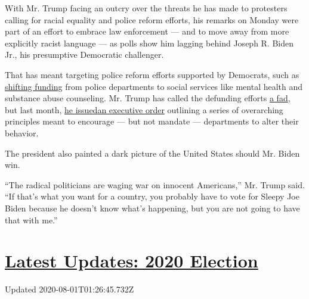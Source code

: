 With Mr. Trump facing an outcry over the threats he has made to
protesters calling for racial equality and police reform efforts, his
remarks on Monday were part of an effort to embrace law enforcement ---
and to move away from more explicitly racist language --- as polls show
him lagging behind Joseph R. Biden Jr., his presumptive Democratic
challenger.

That has meant targeting police reform efforts supported by Democrats,
such as
\href{https://www.cnn.com/2020/06/25/politics/house-police-reform-legislation-vote/index.html}{shifting
funding} from police departments to social services like mental health
and substance abuse counseling. Mr. Trump has called the defunding
efforts
\href{https://www.politico.com/news/2020/07/10/trump-defund-the-police-fad-356442}{a
fad}, but last month,
\href{https://www.whitehouse.gov/presidential-actions/executive-order-safe-policing-safe-communities/}{he
issued}\textbf{\href{https://www.whitehouse.gov/presidential-actions/executive-order-safe-policing-safe-communities/}{}}\href{https://www.whitehouse.gov/presidential-actions/executive-order-safe-policing-safe-communities/}{an
executive order} outlining a series of overarching principles meant to
encourage --- but not mandate --- departments to alter their behavior.

The president also painted a dark picture of the United States should
Mr. Biden win.

``The radical politicians are waging war on innocent Americans,'' Mr.
Trump said. ``If that's what you want for a country, you probably have
to vote for Sleepy Joe Biden because he doesn't know what's happening,
but you are not going to have that with me.''

\hypertarget{latest-updates-2020-election}{%
\section{\texorpdfstring{\href{https://www.nytimes.com/2020/07/31/us/elections/biden-vs-trump.html?action=click\&pgtype=Article\&state=default\&region=MAIN_CONTENT_1\&context=storylines_live_updates}{Latest
Updates: 2020
Election}}{Latest Updates: 2020 Election}}\label{latest-updates-2020-election}}

Updated 2020-08-01T01:26:45.732Z

